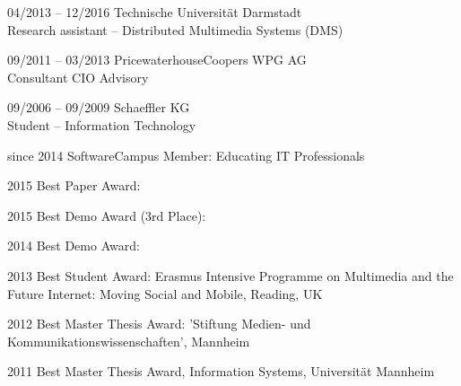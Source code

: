 \begin{cv}{}
\begin{cvlist}{}
		\end{cvlist}
		\begin{cvlist}{}\label{Beruf}	
			\item[04/2013 -- 12/2016] Technische Universit\"at Darmstadt \\
				Research assistant -- Distributed Multimedia Systems (DMS)
			\item[09/2011 -- 03/2013] PricewaterhouseCoopers WPG AG \\
							Consultant CIO Advisory
			\item[09/2006 -- 09/2009] Schaeffler KG\\
										Student -- Information Technology
		\end{cvlist}					
		\nocite{Schulz2015}
		\nocite{Wilk2015Demo}
		\nocite{Richerzhagen2014}
		\begin{cvlist}{}\label{Stip}
			\item[since 2014] SoftwareCampus Member: Educating IT Professionals
			\item[2015] Best Paper Award: 
			\item[2015] Best Demo Award (3rd Place): 
			\item[2014] Best Demo Award: 
			\item[2013] Best Student Award: Erasmus Intensive Programme on Multimedia and the Future Internet: Moving Social and Mobile, Reading, UK
			\item[2012] Best Master Thesis Award: 'Stiftung Medien- und Kommunikationswissenschaften', Mannheim
			\item[2011] Best Master Thesis Award, Information Systems, Universit\"at Mannheim
									

\end{cvlist}
\end{cv}
